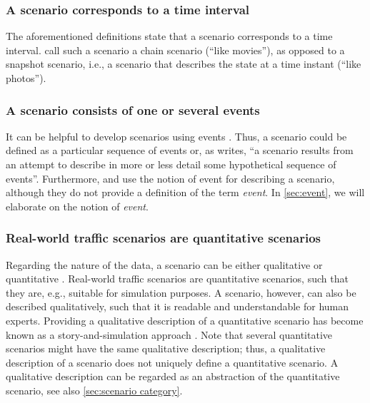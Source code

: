 \subsubsection{A scenario corresponds to a time interval}
The aforementioned definitions \cite{go2004blind, geyer2014, ulbrich2015, elrofai2016scenario} state that a scenario corresponds to a time interval. \textcite{vannotten2003updated} call such a scenario a chain scenario (``like movies''), as opposed to a snapshot scenario, i.e., a scenario that describes the state at a time instant (``like photos''). %

\subsubsection{A scenario consists of one or several events \cite{vannotten2003updated, go2004blind, geyer2014, ulbrich2015, kahn1962, englund2016grand, schoemaker1993multiple, cuppens2002alert, bach2016modelbased}}
It can be helpful to develop scenarios using events \cite{bishop2007scentechniques}. Thus, a scenario could be defined as a particular sequence of events or, as \textcite[p.~143]{kahn1962} writes, ``a scenario results from an attempt to describe in more or less detail some hypothetical sequence of events''. Furthermore, \textcite{geyer2014} and \textcite{ulbrich2015} use the notion of event for describing a scenario, although they do not provide a definition of the term \emph{event}. In \cref{sec:event}, we will elaborate on the notion of \emph{event}.

\subsubsection{Real-world traffic scenarios are quantitative scenarios}
Regarding the nature of the data, a scenario can be either qualitative or quantitative \cite{vannotten2003updated}. Real-world traffic scenarios are quantitative scenarios, such that they are, e.g., suitable for simulation purposes. A scenario, however, can also be described qualitatively, such that it is readable and understandable for human experts. Providing a qualitative description of a quantitative scenario has become known as a story-and-simulation approach \cite{alcamo2001scenarios}. 
Note that several quantitative scenarios might have the same qualitative description; thus, a qualitative description of a scenario does not uniquely define a quantitative scenario. A qualitative description can be regarded as an abstraction of the quantitative scenario, see also \cref{sec:scenario category}.

